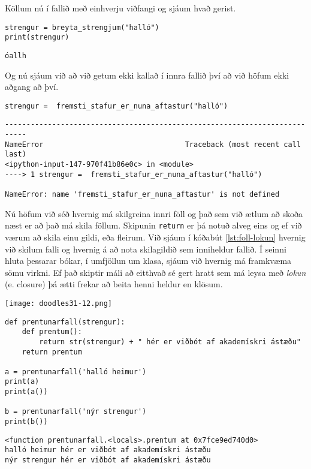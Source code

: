 Köllum nú í fallið með einhverju viðfangi og sjáum hvað gerist.

\begin{lstlisting}[caption=Ytra fallið notað, label=lst:foll-innri-foll-ut1]
strengur = breyta_strengjum("halló")
print(strengur)
\end{lstlisting}
\lstset{style=uttak}
\begin{lstlisting}
óallh	
\end{lstlisting}
\lstset{style=venjulegt}

Og nú sjáum við að við getum ekki kallað í innra fallið því að við höfum ekki aðgang að því.

\begin{lstlisting}[caption=Innra fallið notað þar sem ekki er aðgangur að því, label=lst:foll-innri-foll-ut2]
strengur =  fremsti_stafur_er_nuna_aftastur("halló")
\end{lstlisting}
\lstset{style=uttak}
\begin{lstlisting}
---------------------------------------------------------------------------
NameError                                 Traceback (most recent call last)
<ipython-input-147-970f41b86e0c> in <module>
----> 1 strengur =  fremsti_stafur_er_nuna_aftastur("halló")

NameError: name 'fremsti_stafur_er_nuna_aftastur' is not defined
\end{lstlisting}
\lstset{style=venjulegt}


Nú höfum við séð hvernig má skilgreina innri föll og það sem við ætlum að skoða næst er að það má skila föllum.
Skipunin \texttt{return} er þá notuð alveg eins og ef við værum að skila einu gildi, eða fleirum.
Við sjáum í kóðabút \ref{lst:foll-lokun} hvernig við skilum falli og hvernig á að nota skilagildið sem inniheldur fallið.
Í seinni hluta þessarar bókar, í umfjöllun um klasa, sjáum við hvernig má framkvæma sömu virkni.
Ef það skiptir máli að eitthvað sé gert hratt sem má leysa með \emph{lokun} (e. closure) þá ætti frekar að beita henni heldur en klösum.

\phantom{easter egg}
	\begin{center}
		\texttt{[image: doodles31-12.png]}
	\end{center}

\begin{lstlisting}[caption=Lokun kynnt, label=lst:foll-lokun]
def prentunarfall(strengur):
	def prentum():
		return str(strengur) + " hér er viðbót af akademískri ástæðu"
	return prentum
	
a = prentunarfall('halló heimur')
print(a) 
print(a())

b = prentunarfall('nýr strengur')
print(b())
\end{lstlisting}
\lstset{style=uttak}
\begin{lstlisting}
<function prentunarfall.<locals>.prentum at 0x7fce9ed740d0>
halló heimur hér er viðbót af akademískri ástæðu
nýr strengur hér er viðbót af akademískri ástæðu
\end{lstlisting}
\lstset{style=venjulegt}

